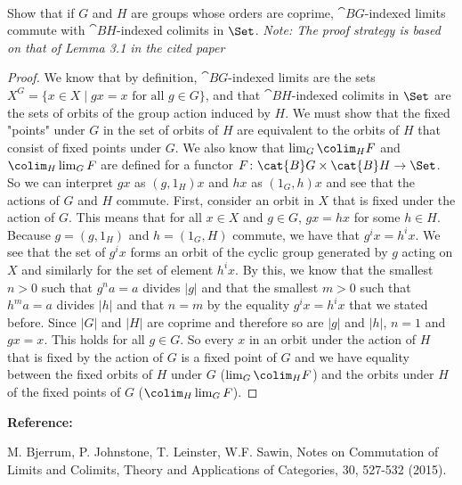 \documentclass[../../main]{subfiles}
\begin{document}
\paragraph{}

\begin{exercise}
 Show that if $G$ and $H$ are groups whose orders are coprime, $\cat{B}G$-indexed limits commute with $\cat{B}H$-indexed colimits in $\Set$.
\textit{Note: The proof strategy is based on that of Lemma 3.1 in the cited paper}
\end{exercise}

\begin{proof}
We know that by definition, $\cat{B}G$-indexed limits are the sets $X^{G} =
\{x \in X \mid gx = x \text{ for all } g \in G\}$, and that  $\cat{B}H$-indexed
colimits in $\Set$ are the sets of orbits of the group action induced by $H$.
We must show that the fixed "points" under $G$ in the set of orbits of $H$ are
equivalent to the orbits of $H$ that consist of fixed points under $G$. We also
know that $\lim_{G}\colim_{H} F $ and $\colim_{H}\lim_{G} F$ are defined for a
functor $F\colon \cat{B}G \times \cat{B}H \rightarrow \Set$. So we can
interpret $gx$ as $(g,1_H)x$ and $hx$ as $(1_G, h)x$ and see that the actions
of $G$ and $H$ commute.
First, consider an orbit in  $X$ that is fixed under the action of $G$. This
means that for all $x \in X$ and $g \in G$, $gx = hx$ for some $h \in H$.
Because $g = (g,1_H)$ and $h = (1_G,H)$ commute, we have that $g^{i}x =
h^{i}x$. We see that the set of $g^{i}x$ forms an orbit of the cyclic group
generated by $g$ acting on $X$ and similarly for the set of element $h^{i}x$.
By this, we know that the  smallest $n > 0$ such that $g^{n}a = a$ divides
$|g|$ and that the  smallest $m > 0$ such that $h^{m}a = a$ divides $|h|$ and
that $n = m$ by the equality $g^{i}x = h^{i}x$ that we stated before. Since
$|G|$ and $|H|$ are coprime and therefore so are $|g|$ and $|h|$, $n = 1$ and
$gx = x$. This holds for all $g \in G$. So every $x$ in an orbit under the
action of $H$ that is fixed by the action of $G$ is a fixed point of $G$ and we
have equality between the fixed orbits of $H$ under $G$ ($\lim_{G}\colim_{H} F
$) and the orbits under $H$ of the fixed points of $G$ ($\colim_{H}\lim_{G}
F$).
\end{proof}
\textbf{Reference:}

M. Bjerrum, P. Johnstone, T. Leinster, W.F. Sawin, Notes on Commutation of Limits and Colimits, Theory and Applications of Categories, 30, 527-532 (2015).
\end{document}
